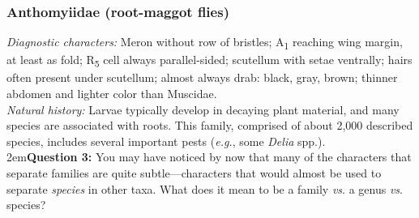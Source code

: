 \documentclass[letterpaper, 11pt]{article}
\begin{document}
\subsubsection{Anthomyiidae (root-maggot flies)}
\noindent{}\textit{Diagnostic characters:} Meron without row of bristles; \texorpdfstring{A\textsubscript{1}}{A1} reaching wing margin, at least as fold; \texorpdfstring{R\textsubscript{5}}{R5} cell always parallel-sided; scutellum with setae ventrally; hairs often present under scutellum; almost always drab: black, gray, brown; thinner abdomen and lighter color than Muscidae.\\

\noindent{}\textit{Natural history:} Larvae typically develop in decaying plant material, and many species are associated with roots. This family, comprised of about 2,000 described species, includes several important pests (\textit{e.g.}, some \textit{Delia} spp.).\\

\hangindent2em\textbf{Question 3:} You may have noticed by now that many of the characters that separate families are quite subtle---characters that would almost be used to separate \textit{species} in other taxa. What does it mean to be a family \textit{vs}. a genus \textit{vs}. species?\\
\end{document}
